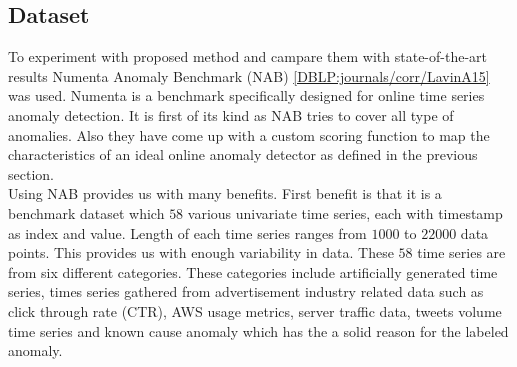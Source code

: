 \documentclass[12pt]{article}
\begin{document}
\subsection{Dataset}
To experiment with proposed method and campare them with state-of-the-art results Numenta Anomaly Benchmark (NAB) \ref{DBLP:journals/corr/LavinA15} was used. Numenta is a benchmark specifically designed for online time series anomaly detection. It is first of its kind as NAB tries to cover all type of anomalies. Also they have come up with a custom scoring function to map the characteristics of an ideal online anomaly detector as defined in the previous section.\\
\break
Using NAB provides us with many benefits. First benefit is that it is a benchmark dataset which $58$ various univariate time series, each with timestamp as index and value. Length of each time series ranges from $1000$ to $22000$ data points. This provides us with enough variability in data. These $58$ time series are from six different categories. These categories include artificially generated time series, times series gathered from advertisement industry related data such as click through rate (CTR), AWS usage metrics, server traffic data, tweets volume time series and known cause anomaly which has the a solid reason for the labeled anomaly.\\
\break
\end{document}

